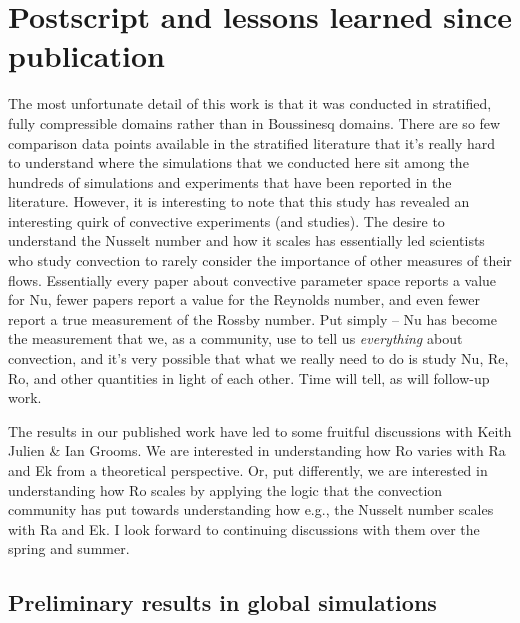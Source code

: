 \newpage
\section{Postscript and lessons learned since publication}
\label{sec_ro_p19_:ro_p19_postscript}
The most unfortunate detail of this work is that it was conducted in stratified, fully compressible domains rather than in Boussinesq domains.
There are so few comparison data points available in the stratified literature that it's really hard to understand where the simulations that we conducted here sit among the hundreds of simulations and experiments that have been reported in the \RB literature.
However, it is interesting to note that this study has revealed an interesting quirk of convective experiments (and studies).
The desire to understand the Nusselt number and how it scales has essentially led scientists who study convection to rarely consider the importance of other measures of their flows.
Essentially every paper about convective parameter space reports a value for Nu, fewer papers report a value for the Reynolds number, and even fewer report a true measurement of the Rossby number.
Put simply -- Nu has become the measurement that we, as a community, use to tell us \emph{everything} about convection, and it's very possible that what we really need to do is study Nu, Re, Ro, and other quantities in light of each other.
Time will tell, as will follow-up work.

The results in our published work have led to some fruitful discussions with Keith Julien \& Ian Grooms.
We are interested in understanding how Ro varies with Ra and Ek from a theoretical perspective.
Or, put differently, we are interested in understanding how Ro scales by applying the logic that the \RB convection community has put towards understanding how e.g., the Nusselt number scales with Ra and Ek.
I look forward to continuing discussions with them over the spring and summer.


\subsection{Preliminary results in global simulations}


